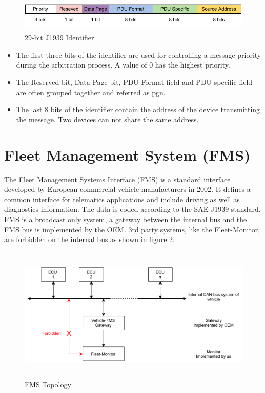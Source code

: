 \begin{figure}[h!]
	\centering
	\includegraphics[height=1.5cm]{images/j1939-identifier}
	\caption{29-bit J1939 Identifier}
	\label{fig:29-bit_J1939_Identifier}
\end{figure}
\begin{itemize}
	\item The first three bits of the identifier are used for controlling a message priority during the arbitration process. A value of 0 has the highest priority.
	\item The Reserved bit, Data Page bit, PDU Format field and PDU specific field are often grouped together and referred as \acrfull{pgn}. 
	\item The last 8 bits of the identifier contain the address of the device transmitting the message. Two devices can not share the same address.
\end{itemize}
\newpage

\section{Fleet Management System (FMS)}
The Fleet Management Systems Interface (FMS) is a standard interface developed by European commercial vehicle manufacturers in 2002. It defines a common interface for telematics applications and include driving as well as diagnostics information. The data is coded according to the SAE J1939 standard. FMS is a broadcast only system, a gateway between the internal bus and the FMS bus is implemented by the OEM. 3rd party systems, like the Fleet-Monitor, are forbidden on the internal bus as shown in figure \ref{fig:fms-bus}. 

\begin{figure}[h!]
	\centering
	\hfuzz=14.0pt
	\includegraphics[height=6.5cm]{images/fms-bus}
	\caption{FMS Topology}
	\label{fig:fms-bus}
\end{figure}

